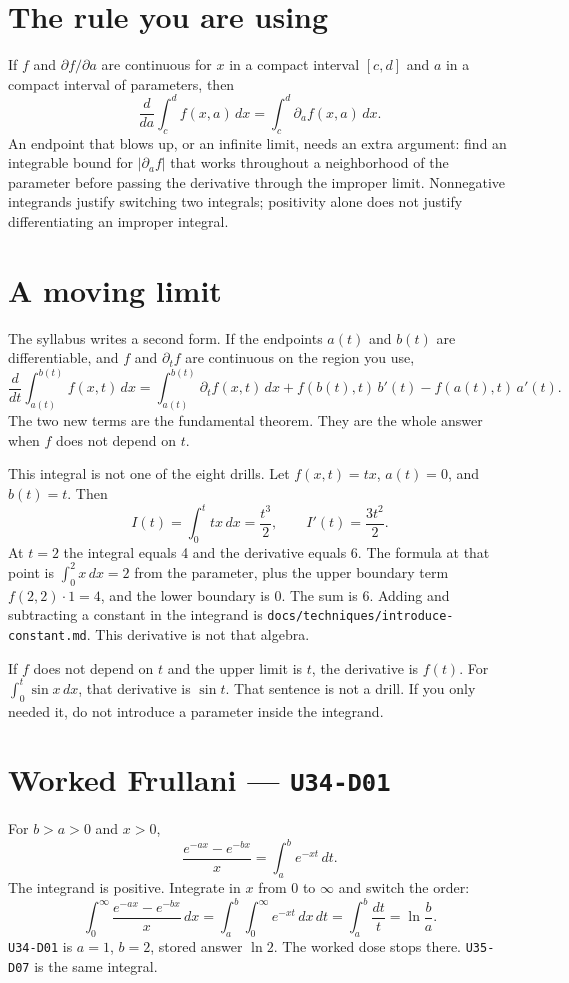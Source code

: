 \section{The rule you are using}
If $f$ and $\partial f/\partial a$ are continuous for $x$ in a compact interval $[c,d]$ and $a$ in a compact interval of parameters, then
\[
\frac{d}{da}\int_c^d f(x,a)\,dx = \int_c^d \partial_a f(x,a)\,dx.
\]
An endpoint that blows up, or an infinite limit, needs an extra argument: find an integrable bound for $|\partial_a f|$ that works throughout a neighborhood of the parameter before passing the derivative through the improper limit. Nonnegative integrands justify switching two integrals; positivity alone does not justify differentiating an improper integral.

\section{A moving limit}
The syllabus writes a second form. If the endpoints $a(t)$ and $b(t)$ are differentiable, and $f$ and $\partial_t f$ are continuous on the region you use,
\[
\frac{d}{dt}\int_{a(t)}^{b(t)} f(x,t)\,dx
=
\int_{a(t)}^{b(t)}\partial_t f(x,t)\,dx
+ f(b(t),t)\,b'(t)
- f(a(t),t)\,a'(t).
\]
The two new terms are the fundamental theorem. They are the whole answer when $f$ does not depend on $t$.

This integral is not one of the eight drills. Let $f(x,t)=tx$, $a(t)=0$, and $b(t)=t$. Then
\[
I(t)=\int_0^t tx\,dx=\frac{t^3}{2},\qquad I'(t)=\frac{3t^2}{2}.
\]
At $t=2$ the integral equals 4 and the derivative equals 6. The formula at that point is $\int_0^2 x\,dx=2$ from the parameter, plus the upper boundary term $f(2,2)\cdot 1=4$, and the lower boundary is 0. The sum is 6. Adding and subtracting a constant in the integrand is \texttt{docs/techniques/introduce-constant.md}. This derivative is not that algebra.

If $f$ does not depend on $t$ and the upper limit is $t$, the derivative is $f(t)$. For $\int_0^t\sin x\,dx$, that derivative is $\sin t$. That sentence is not a drill. If you only needed it, do not introduce a parameter inside the integrand.

\section{Worked Frullani --- \texttt{U34-D01}}
For $b>a>0$ and $x>0$,
\[
\frac{e^{-ax}-e^{-bx}}{x}=\int_a^b e^{-xt}\,dt.
\]
The integrand is positive. Integrate in $x$ from 0 to $\infty$ and switch the order:
\[
\int_0^\infty\frac{e^{-ax}-e^{-bx}}{x}\,dx=\int_a^b\int_0^\infty e^{-xt}\,dx\,dt=\int_a^b\frac{dt}{t}=\ln\frac{b}{a}.
\]
\texttt{U34-D01} is $a=1$, $b=2$, stored answer $\ln 2$. The worked dose stops there. \texttt{U35-D07} is the same integral.

